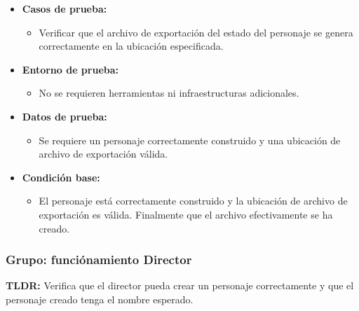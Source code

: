 \documentclass{article}
\begin{document}
\begin{itemize}
	\item \textbf{Casos de prueba:}
	\begin{itemize}
		\item Verificar que el archivo de exportación del estado del personaje se genera correctamente en la ubicación especificada.
	\end{itemize}
	
	\item \textbf{Entorno de prueba:}
	\begin{itemize}
		\item No se requieren herramientas ni infraestructuras adicionales.
	\end{itemize}
	
	\item \textbf{Datos de prueba:}
	\begin{itemize}
		\item Se requiere un personaje correctamente construido y una ubicación de archivo de exportación válida.
	\end{itemize}
	
	\item \textbf{Condición base:}
	\begin{itemize}
		\item El personaje está correctamente construido y la ubicación de archivo de exportación es válida. Finalmente que el archivo efectivamente se ha creado.
	\end{itemize}
\end{itemize}



\subsubsection{Grupo: funciónamiento Director}
\textbf{TLDR:} Verifica que el director pueda crear un personaje correctamente y que el personaje creado tenga el nombre esperado.
\end{document}
